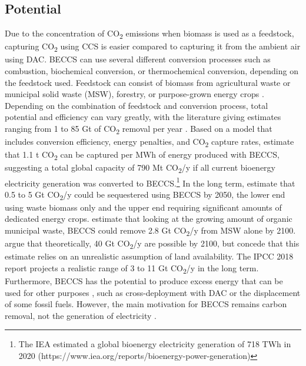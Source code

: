 \subsection*{Potential}
Due to the concentration of CO\textsubscript{2} emissions when biomass is used as a feedstock, capturing CO\textsubscript{2} using CCS is easier compared to capturing it from the ambient air using DAC. BECCS can use several different conversion processes such as combustion, biochemical conversion, or thermochemical conversion, depending on the feedstock used. Feedstock can consist of biomass from agricultural waste or municipal solid waste (MSW), forestry, or purpose-grown energy crops \parencite{Dipple2021TheSystems}. Depending on the combination of feedstock and conversion process, total potential and efficiency can vary greatly, with the literature giving estimates ranging from 1 to 85 Gt of CO\textsubscript{2} removal per year \parencite[342]{IPCC2018Global1.5C}.
Based on a model that includes conversion efficiency, energy penalties, and CO\textsubscript{2} capture rates, \textcite{Garcia-Freites2021TheTarget} estimate that 1.1 t CO\textsubscript{2} can be captured per MWh of energy produced with BECCS, suggesting a total global capacity of 790 Mt CO\textsubscript{2}/y if all current bioenergy electricity generation was converted to BECCS.\footnote{The IEA estimated a global bioenergy electricity generation of 718 TWh in 2020 (https://www.iea.org/reports/bioenergy-power-generation)}
In the long term, \textcite{Fuss2018NegativeEffects} estimate that 0.5 to 5 Gt CO\textsubscript{2}/y could be sequestered using BECCS by 2050, the lower end using waste biomass only and the upper end requiring significant amounts of dedicated energy crops. \textcite{Pour2018PotentialBECCS} estimate that looking at the growing amount of organic municipal waste, BECCS could remove 2.8 Gt CO\textsubscript{2}/y from MSW alone by 2100. \textcite{Hanssen2020TheStorage} argue that theoretically, 40 Gt CO\textsubscript{2}/y are possible by 2100, but concede that this estimate relies on an unrealistic assumption of land availability.
The IPCC 2018 report projects a realistic range of 3 to 11 Gt CO\textsubscript{2}/y in the long term.
Furthermore, BECCS has the potential to produce excess energy that can be used for other purposes \parencite{Fajardy2017CanEmissions}, such as cross-deployment with DAC or the displacement of some fossil fuels. However, the main motivation for BECCS remains carbon removal, not the generation of electricity \parencite{Klein2014TheREMIND-MAgPIE}.
